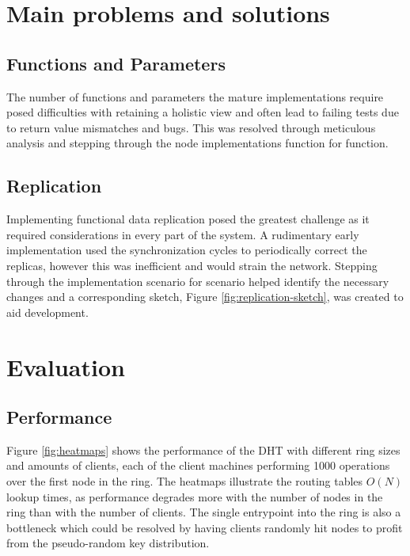 \documentclass[a4paper, 11pt]{article}
\begin{document}
\section{Main problems and solutions}

\subsection{Functions and Parameters}

The number of functions and parameters the mature implementations require posed difficulties with retaining a holistic view and often lead to failing tests due to return value mismatches and bugs. 
This was resolved through meticulous analysis and stepping through the node implementations function for function.

\subsection{Replication}

Implementing functional data replication posed the greatest challenge as it required considerations in every part of the system.
A rudimentary early implementation used the synchronization cycles to periodically correct the replicas, however this was inefficient and would strain the network. 
Stepping through the implementation scenario for scenario helped identify the necessary changes and a corresponding sketch, Figure \ref{fig:replication-sketch}, was created to aid development.

\section{Evaluation}

\subsection{Performance}

Figure \ref{fig:heatmaps} shows the performance of the DHT with different ring sizes and amounts of clients, each of the client machines performing 1000 operations over the first node in the ring.
The heatmaps illustrate the routing tables $O(N)$ lookup times, as performance degrades more with the number of nodes in the ring than with the number of clients.
The single entrypoint into the ring is also a bottleneck which could be resolved by having clients randomly hit nodes to profit from the pseudo-random key distribution.
\end{document}
